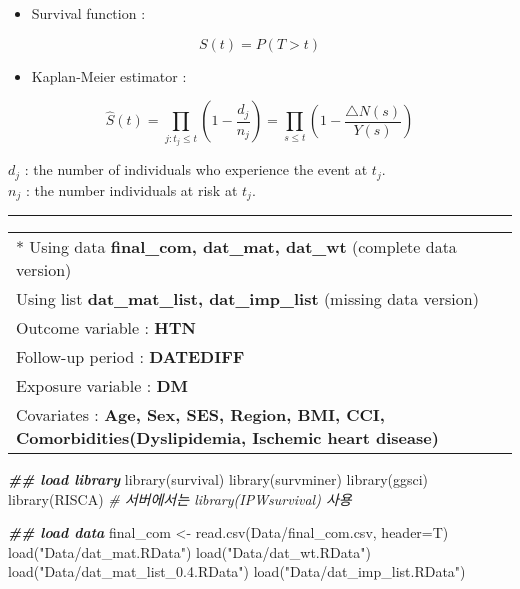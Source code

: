 \documentclass[
]{book}
\newenvironment{Shaded}{\begin{snugshade}}{\end{snugshade}}
\newcommand{\AttributeTok}[1]{\textcolor[rgb]{0.77,0.63,0.00}{#1}}
\newcommand{\CommentTok}[1]{\textcolor[rgb]{0.56,0.35,0.01}{\textit{#1}}}
\newcommand{\DocumentationTok}[1]{\textcolor[rgb]{0.56,0.35,0.01}{\textbf{\textit{#1}}}}
\newcommand{\FunctionTok}[1]{\textcolor[rgb]{0.00,0.00,0.00}{#1}}
\newcommand{\NormalTok}[1]{#1}
\newcommand{\OtherTok}[1]{\textcolor[rgb]{0.56,0.35,0.01}{#1}}
\newcommand{\StringTok}[1]{\textcolor[rgb]{0.31,0.60,0.02}{#1}}
\providecommand{\tightlist}{%
  \setlength{\itemsep}{0pt}\setlength{\parskip}{0pt}}
\begin{document}
\begin{itemize}
\tightlist
\item
  Survival function :
\end{itemize}

\[S(t)=P(T > t)\]

\begin{itemize}
\tightlist
\item
  Kaplan-Meier estimator :
\end{itemize}

\[\hat S(t)=\prod_{j:t_j\le t}\left(1-\frac{d_j}{n_j}\right)=\prod_{s\le t}\left(1-\frac{\bigtriangleup N(s)}{Y(s)}\right)\]

\(d_j\) : the number of individuals who experience the event at \(t_j\).\\
\(n_j\) : the number individuals at risk at \(t_j\).\\

\begin{center}\rule{0.5\linewidth}{0.5pt}\end{center}

\begin{longtable}[]{@{}l@{}}
\toprule()
\endhead
* Using data \textbf{final\_com, dat\_mat, dat\_wt} (complete data version) \\
Using list \textbf{dat\_mat\_list, dat\_imp\_list} (missing data version) \\
Outcome variable : \textbf{HTN} \\
Follow-up period : \textbf{DATEDIFF} \\
Exposure variable : \textbf{DM} \\
Covariates : \textbf{Age, Sex, SES, Region, BMI, CCI, Comorbidities(Dyslipidemia, Ischemic heart disease)} \\
\bottomrule()
\end{longtable}

\begin{Shaded}
\begin{Highlighting}[]
\DocumentationTok{\#\# load library}
\FunctionTok{library}\NormalTok{(survival)}
\FunctionTok{library}\NormalTok{(survminer)}
\FunctionTok{library}\NormalTok{(ggsci)}
\FunctionTok{library}\NormalTok{(RISCA) }\CommentTok{\# 서버에서는 library(IPWsurvival) 사용}
\end{Highlighting}
\end{Shaded}

\begin{Shaded}
\begin{Highlighting}[]
\DocumentationTok{\#\# load data}
\NormalTok{final\_com }\OtherTok{\textless{}{-}} \FunctionTok{read.csv}\NormalTok{(}\StringTok{\textquotesingle{}Data/final\_com.csv\textquotesingle{}}\NormalTok{, }\AttributeTok{header=}\NormalTok{T)}
\FunctionTok{load}\NormalTok{(}\StringTok{"Data/dat\_mat.RData"}\NormalTok{)}
\FunctionTok{load}\NormalTok{(}\StringTok{"Data/dat\_wt.RData"}\NormalTok{)}
\FunctionTok{load}\NormalTok{(}\StringTok{"Data/dat\_mat\_list\_0.4.RData"}\NormalTok{)}
\FunctionTok{load}\NormalTok{(}\StringTok{"Data/dat\_imp\_list.RData"}\NormalTok{)}
\end{Highlighting}
\end{Shaded}
\end{document}
